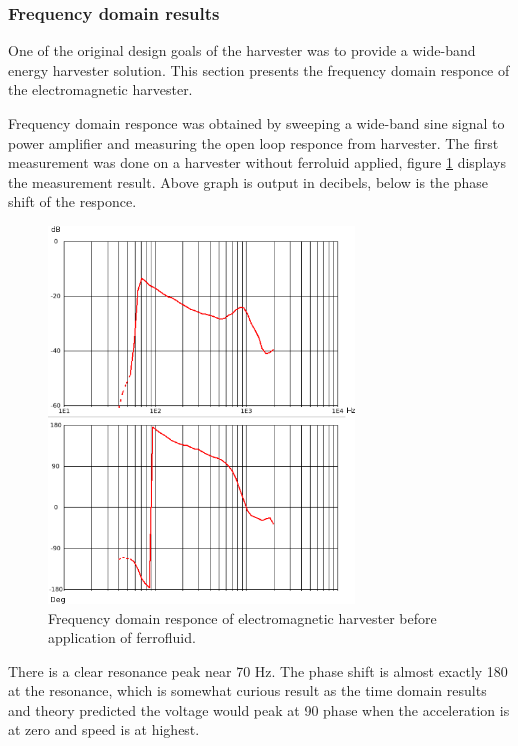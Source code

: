 \subsubsection{Frequency domain results} \label{sect:emh_fd}
One of the original design goals of the harvester was to provide a wide-band energy harvester solution. This section presents the frequency domain responce of the electromagnetic harvester.

Frequency domain responce was obtained by sweeping a wide-band sine signal to power amplifier and measuring the open loop responce from harvester. The first measurement was done on a harvester without ferroluid applied, figure \ref{fig:inductive_fd_dry} displays the measurement result. Above graph is output in decibels, below is the phase shift of the responce.

\begin{figure}[htb]
\begin{center}
\includegraphics[height=10cm]{images/own_measurement/generator_shaker/inductive_fd_dry.png}
\end{center}
\caption{\label{fig:inductive_fd_dry} Frequency domain responce of electromagnetic harvester before application of ferrofluid.}
\end{figure}

There is a clear resonance peak near 70 Hz. The phase shift is almost exactly 180 \degree at the resonance, which is somewhat curious result as the time domain results and theory predicted the voltage would peak at 90 \degree phase when the acceleration is at zero and speed is at highest. 

